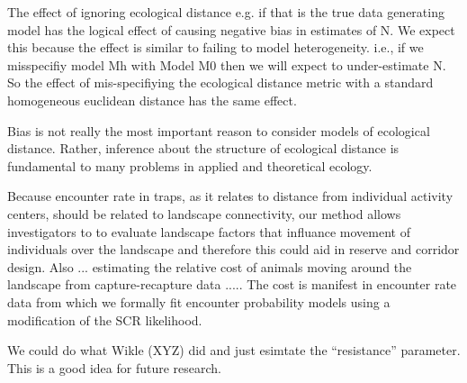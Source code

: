 The effect of ignoring ecological distance e.g. if that is the true
data generating model has the logical effect of causing negative bias
in estimates of N. We expect this because the effect is similar to
failing to model heterogeneity. i.e., if we misspecifiy model Mh with
Model M0 then we will expect to under-estimate N. So the effect of
mis-specifiying the ecological distance metric with a standard
homogeneous euclidean distance has the same effect.

Bias is not really the most important reason to consider models of
ecological distance. Rather, inference about the structure of
ecological distance is fundamental to many problems in applied and
theoretical ecology.

Because encounter rate in traps, as it relates to distance from
individual activity centers, should be related to landscape
connectivity, our method allows investigators to to evaluate landscape
factors that influance movement of individuals over the landscape and
therefore this could aid in reserve and corridor design.  Also ...
estimating the relative cost of animals moving around the landscape
from capture-recapture data ..... The cost is manifest in encounter
rate data from which we formally fit encounter probability models
using a modification of the SCR likelihood.




We could do what Wikle (XYZ) did and just esimtate the ``resistance''
parameter. This is a good idea for future research. 














